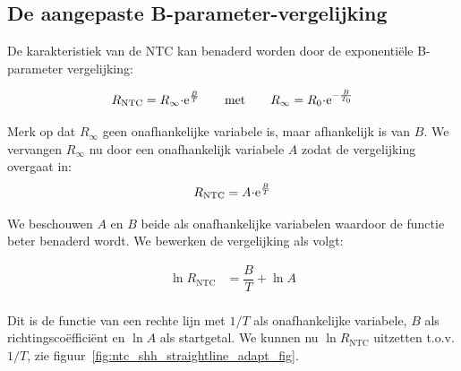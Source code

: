 \documentclass[12pt,a4paper,final,twoside,fleqn]{article}
\newcommand{\rntc}{R_\text{NTC}}
\let\oldcdot\cdot
\renewcommand{\cdot}{\kern-.10em\oldcdot\kern-.10em}
\begin{document}
\subsection{De aangepaste B-parameter-vergelijking}
De karakteristiek van de NTC kan benaderd worden door de exponenti\"ele
B-parameter vergelijking:

\begin{equation}
R_\text{NTC} = R_\infty \cdot\text{e}^\frac{B}{T} \qquad \text{met} \qquad R_\infty = R_0\cdot \text{e}^{-\frac{B}{T_0}}
\end{equation}

Merk op dat $R_\infty$ geen onafhankelijke variabele is, maar afhankelijk is van $B$.
We vervangen $R_\infty$ nu door een onafhankelijk variabele $A$ zodat de vergelijking
overgaat in:
\begin{equation}
\label{equ:betafuncexpAB}
R_\text{NTC} = A \cdot\text{e}^\frac{B}{T}
\end{equation}

We beschouwen $A$ en $B$ beide als onafhankelijke variabelen waardoor de functie beter
benaderd wordt. We bewerken de vergelijking als volgt:

\begin{equation}
\begin{split}
\ln \rntc &= \dfrac{B}{T} + \ln A \\
\end{split}
\end{equation}

Dit is de functie van een rechte lijn met $1/T$ als onafhankelijke variabele, $B$
als richtingsco\"effici\"ent en $\ln A$ als startgetal.
We kunnen nu $\ln \rntc$ uitzetten t.o.v.\@ $1/T$, zie
figuur~\ref{fig:ntc_shh_straightline_adapt_fig}.
\end{document}

